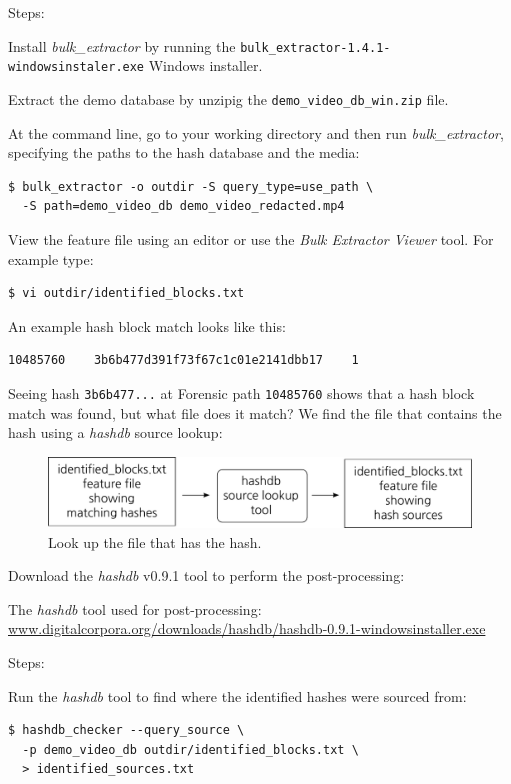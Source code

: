 \documentclass[12pt,twoside]{article}
\newcommand{\hdb}{\emph{hashdb}\xspace}
\newcommand{\bulk}{\emph{bulk\_extractor}\xspace}
\newcommand{\bev}{\emph{Bulk Extractor Viewer}\xspace}
\begin{document}
Steps:
\begin{compactenum}
\item Install \bulk by running the
\texttt{bulk\_extractor-1.4.1-windowsinstaler.exe} Windows installer.
\item Extract the demo database
by unzipig the \texttt{demo\_video\_db\_win.zip} file.
\item At the command line, go to your working directory and then run \bulk,
specifying the paths to the hash database and the media:
\begin{verbatim}
$ bulk_extractor -o outdir -S query_type=use_path \
  -S path=demo_video_db demo_video_redacted.mp4
\end{verbatim}
\item View the feature file using an editor or use the \bev tool.
For example type:
\begin{verbatim}
$ vi outdir/identified_blocks.txt
\end{verbatim}
An example hash block match looks like this:
\begin{verbatim}
10485760    3b6b477d391f73f67c1c01e2141dbb17    1
\end{verbatim}
\end{compactenum}

Seeing hash \texttt{3b6b477...} at Forensic path \texttt{10485760}
shows that a hash block match was found, but what file does it match?
We find the file that contains the hash using a \hdb source lookup:
\begin{figure}[H]
  \center
  \includegraphics[scale=0.6]{drawings/source_lookup}
  \caption*{Look up the file that has the hash.}
  \label{fig:source_lookup}
\end{figure}

Download the \hdb v0.9.1 tool to perform the post-processing:
\begin{compactitem}
\item The \hdb tool used for post-processing:
\url{www.digitalcorpora.org/downloads/hashdb/hashdb-0.9.1-windowsinstaller.exe}
\end{compactitem}

Steps:
\begin{compactenum}
\item Run the \hdb tool to find where the identified hashes were sourced from:
\begin{verbatim}
$ hashdb_checker --query_source \
  -p demo_video_db outdir/identified_blocks.txt \
  > identified_sources.txt
\end{verbatim}
\end{compactenum}
\end{document}
